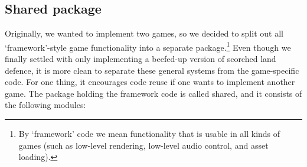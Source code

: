 \documentclass[a4paper,10pt]{article}
\begin{document}
\subsection{Shared package}
Originally, we wanted to implement two games, so we decided to split out all
`framework'-style game functionality into a separate package.\footnote{By
`framework' code we mean functionality that is usable in all kinds of games
(such as low-level rendering, low-level audio control, and asset loading).}
Even though we finally settled with only implementing a beefed-up version of
scorched land defence, it is more clean to separate these general systems from
the game-specific code. For one thing, it encourages code reuse if one wants
to implement another game. The package holding the framework code is called
\textsf{shared}, and it consists of the following modules:
\end{document}
